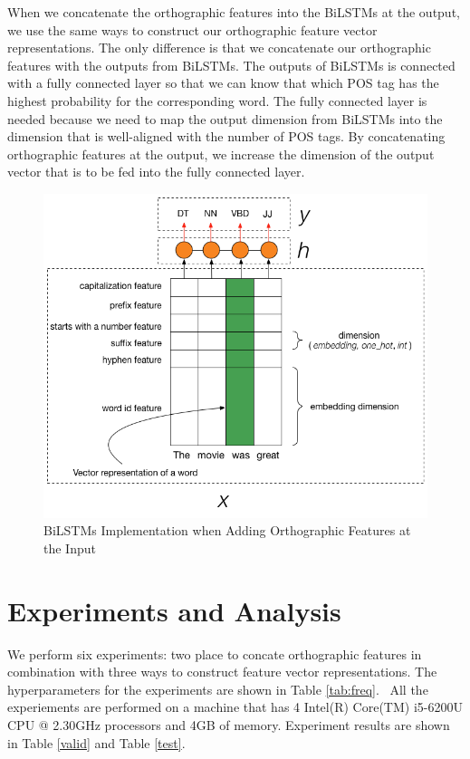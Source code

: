 \documentclass[11pt,letterpaper]{article}
\begin{document}
When we concatenate the orthographic features into the BiLSTMs at the output, we use the same ways to construct
our orthographic feature vector representations. The only difference is that we concatenate our orthographic features
with the outputs from BiLSTMs. The outputs of BiLSTMs is connected with a fully connected layer so that we can know
that which POS tag has the highest probability for the corresponding word. The fully connected layer is needed because
we need to map the output dimension from BiLSTMs into the dimension that is well-aligned with the number of POS tags.
By concatenating orthographic features at the output, we increase the dimension of the output vector that is to be fed
into the fully connected layer.

\begin{figure}
\includegraphics[scale=0.35]{LSTM.png}
\caption{BiLSTMs Implementation when Adding Orthographic Features at the Input}
\label{fig:2}
\end{figure}

\section{Experiments and Analysis}
\label{ssec:layout}

We perform six experiments: two place to concate orthographic features in combination
with three ways to construct feature vector representations. The hyperparameters for
the experiments are shown in Table \ref{tab:freq}.  All the experiements are performed on
a machine that has 4 Intel(R) Core(TM) i5-6200U CPU @ 2.30GHz processors and 4GB of memory.
Experiment results are shown in Table \ref{valid} and Table \ref{test}.
\end{document}

